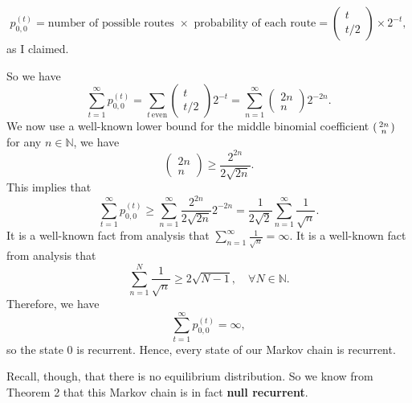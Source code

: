 \documentclass[11pt,a4paper]{article}
\newenvironment{psmallmatrix}
  {\left(\begin{smallmatrix}}
  {\end{smallmatrix}\right)}
\begin{document}
    $$
    p_{0,0}^{(t)}
    =
    \text{number of possible routes }\times \text{ probability of each route}
    =
    \begin{pmatrix}
      t \\ t/2
    \end{pmatrix}
    \times 2^{-t},
    $$
    as I claimed.\par 
    So we have
    $$
    \sum_{t = 1}^\infty p_{0,0}^{(t)}
    =
    \sum_{t\ \text{even}}
    \begin{pmatrix}
      t \\ t/2
    \end{pmatrix}
    2^{-t}
    =
    \sum_{n=1}^\infty
    \begin{pmatrix}
      2n \\ n
    \end{pmatrix}
    2^{-2n}.
    $$
    We now use a well-known lower bound for the middle binomial coefficient
    $
    \begin{psmallmatrix}
      2n \\ n
    \end{psmallmatrix}
    $
    for any $n \in \mathbb{N}$, we have
    $$
    \begin{pmatrix}
      2n \\ n
    \end{pmatrix}
    \geq
    \frac{2^{2n}}{2\sqrt{2n}}.
    $$
    This implies that
    $$
    \sum_{t = 1}^\infty p_{0,0}^{(t)}
    \geq
    \sum_{n=1}^\infty \frac{2^{2n}}{2\sqrt{2n}}2^{-2n}
    =
    \frac{1}{2\sqrt{2}}\sum_{n=1}^\infty \frac{1}{\sqrt{n}}.
    $$
    It is a well-known fact from analysis that $\sum_{n=1}^\infty \frac{1}{\sqrt{n}} = \infty$. It is a well-known fact from analysis that
    $$
    \sum_{n=1}^N\frac{1}{\sqrt{n}} \geq 2\sqrt{N-1},\quad \forall N \in \mathbb{N}.
    $$
    Therefore, we have
    $$\sum_{t=1}^\infty p_{0,0}^{(t)}= \infty ,$$
    so the state $0$ is recurrent. Hence, every state of our Markov chain is recurrent.\par 
    Recall, though, that there is no equilibrium distribution. So we know from Theorem 2 that this Markov chain is in fact \textbf{null recurrent}.
\end{document}
